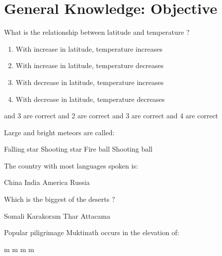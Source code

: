 \section*{General Knowledge: Objective}

\begin{questions}


\question What is the relationship between latitude and temperature ?
  \begin{enumerate}
  \item With increase in latitude, temperature increases
  \item With increase in latitude, temperature decreases
  \item With decrease in latitude, temperature increases
  \item With decrease in latitude, temperature decreases
  \end{enumerate}
  
  \begin{choices}
   and 3 are correct
   and 2 are correct
   and 3 are correct
   and 4 are correct
  \end{choices}

\question Large and bright meteors are called:
  \begin{choices}
  \choice Falling star
  \choice Shooting star
  \choice Fire ball
  \choice Shooting ball
  \end{choices}

\question The country with most languages spoken is:

  \begin{oneparchoices}
  \choice China
  \choice India
  \choice America
  \choice Russia
  \end{oneparchoices}

\question Which is the biggest of the deserts ?
  
  \begin{oneparchoices}
  \choice Somali
  \choice Karakoram
  \choice Thar
  \choice Attacama
  \end{oneparchoices}

\question Popular piligrimage Muktinath occurs in the elevation of:
  \begin{choices}
   m
   m
   m
   m
  \end{choices}


\end{questions}
